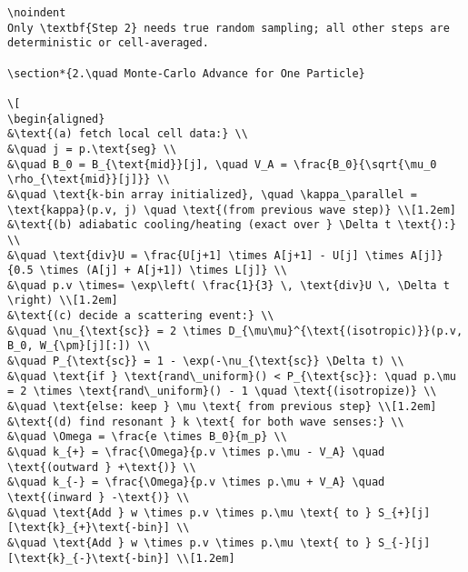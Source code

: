 \begin{verbatim}
\noindent
Only \textbf{Step 2} needs true random sampling; all other steps are deterministic or cell-averaged.

\section*{2.\quad Monte-Carlo Advance for One Particle}

\[
\begin{aligned}
&\text{(a) fetch local cell data:} \\
&\quad j = p.\text{seg} \\
&\quad B_0 = B_{\text{mid}}[j], \quad V_A = \frac{B_0}{\sqrt{\mu_0 \rho_{\text{mid}}[j]}} \\
&\quad \text{k-bin array initialized}, \quad \kappa_\parallel = \text{kappa}(p.v, j) \quad \text{(from previous wave step)} \\[1.2em]
&\text{(b) adiabatic cooling/heating (exact over } \Delta t \text{):} \\
&\quad \text{div}U = \frac{U[j+1] \times A[j+1] - U[j] \times A[j]}{0.5 \times (A[j] + A[j+1]) \times L[j]} \\
&\quad p.v \times= \exp\left( \frac{1}{3} \, \text{div}U \, \Delta t \right) \\[1.2em]
&\text{(c) decide a scattering event:} \\
&\quad \nu_{\text{sc}} = 2 \times D_{\mu\mu}^{\text{(isotropic)}}(p.v, B_0, W_{\pm}[j][:]) \\
&\quad P_{\text{sc}} = 1 - \exp(-\nu_{\text{sc}} \Delta t) \\
&\quad \text{if } \text{rand\_uniform}() < P_{\text{sc}}: \quad p.\mu = 2 \times \text{rand\_uniform}() - 1 \quad \text{(isotropize)} \\
&\quad \text{else: keep } \mu \text{ from previous step} \\[1.2em]
&\text{(d) find resonant } k \text{ for both wave senses:} \\
&\quad \Omega = \frac{e \times B_0}{m_p} \\
&\quad k_{+} = \frac{\Omega}{p.v \times p.\mu - V_A} \quad \text{(outward } +\text{)} \\
&\quad k_{-} = \frac{\Omega}{p.v \times p.\mu + V_A} \quad \text{(inward } -\text{)} \\
&\quad \text{Add } w \times p.v \times p.\mu \text{ to } S_{+}[j][\text{k}_{+}\text{-bin}] \\
&\quad \text{Add } w \times p.v \times p.\mu \text{ to } S_{-}[j][\text{k}_{-}\text{-bin}] \\[1.2em]

\end{verbatim}
